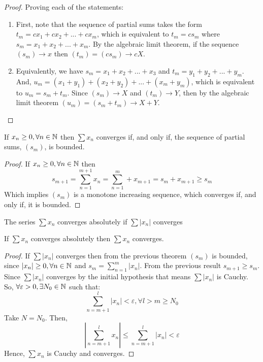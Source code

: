 \begin{proof}
    Proving each of the statements:
    \begin{enumerate}
        \item First, note that the sequence of partial sums takes the form $t_m = c x_1 + c x_2 + ... + c x_m$, which is equivalent to $t_m = c s_m$ where $s_m = x_1 + x_2 + ... + x_m$. By the algebraic limit theorem, if the sequence $(s_m) \to x$ then $(t_m) = (c s_m) \to c X$.
        \item Equivalently, we have $s_m = x_1 + x_2 + ... + x_3$ and $t_m = y_1 + y_2 + ... + y_m$. And, $u_m = (x_1+y_1) + (x_2+y_2) + ... + (x_m+y_m) $, which is equivalent to $u_m = s_m + t_m$. Since $(s_m) \to X$ and $(t_m) \to Y$, then by the algebraic limit theorem $(u_m) = (s_m + t_m) \to X + Y$.
    \end{enumerate}
\end{proof}

\begin{theorem}
    If $x_n \geq 0, \forall n \in \mathbb{N}$ then $\sum x_n$ converges if, and only if, the sequence of partial sums, $(s_m)$, is bounded.
\end{theorem}

\begin{proof}
    If $x_n \geq 0, \forall n \in \mathbb{N}$ then
    \begin{equation*}
        s_{m+1} = \sum \limits_{n=1}^{m+1} x_n = \sum \limits_{n=1}^m + x_{m+1} = s_m + x_{m+1} \geq s_m
    \end{equation*}
    Which implies $(s_m)$ is a monotone increasing sequence, which converges if, and only if, it is bounded.
\end{proof}

\begin{definition}
    The series $\sum x_n$ converges absolutely if $\sum |x_n|$ converges
\end{definition}

\begin{theorem}
    If $\sum x_n$ converges absolutely then $\sum x_n$ converges.
\end{theorem}

\begin{proof}
    If $\sum |x_n|$ converges then from the previous theorem $(s_m)$ is bounded, since $|x_n| \geq 0, \forall n \in \mathbb{N}$ and $s_m = \sum_{n=1}^m |x_n|$. From the previous result $s_{m+1} \geq s_m$. Since $\sum |x_n|$ converges by the initial hypothesis that means $\sum |x_n|$ is Cauchy. So, $\forall \varepsilon > 0, \exists N_0 \in \mathbb{N}$ such that:
    \begin{equation*}
        \sum \limits_{n=m+1}^l |x_n| < \varepsilon, \forall l > m \geq N_0
    \end{equation*}
    Take $N = N_0$. Then, 
    \begin{equation*}
        \left |
            \sum \limits_{n=m+1}^l x_n
        \right | \leq
        \sum \limits_{n=m+1}^l |x_n|
        < \varepsilon
    \end{equation*}
    Hence, $\sum x_n$ is Cauchy and converges.
\end{proof}

